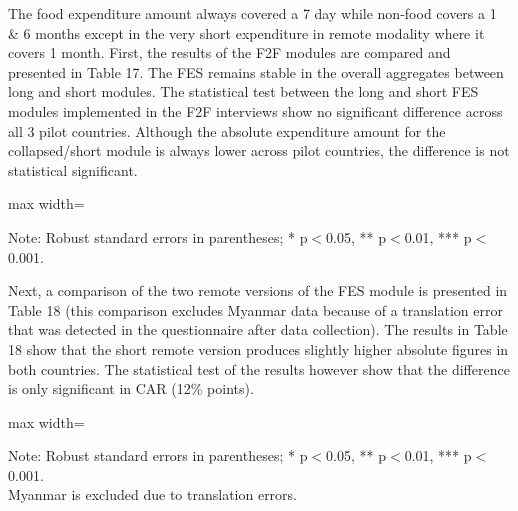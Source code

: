 \documentclass[11pt,harvard]{article}
\begin{document}
The food expenditure amount always covered a 7 day while non-food covers a 1 \& 6 months except in the very short expenditure in remote modality where it covers 1 month. First, the results of the F2F modules are compared and presented in Table 17. The FES remains stable in the overall aggregates between long and short modules. The statistical test between the long and short FES modules implemented in the F2F interviews show no significant difference across all 3 pilot countries. Although the absolute expenditure amount for the collapsed/short module is always lower across pilot countries, the difference is not statistical significant. 

\begin{table}[htbp]
	\centering
	\begin{adjustbox}{max width=\textwidth}
		\begin{threeparttable}
			\caption{Impact of Module Length on Expenditure and FES in F2F Surveys}
			\scriptsize
			 
			\label{tab:FES_F2F_Form_Length_All_Country}
			\begin{tablenotes}
				\item Note: Robust standard errors in parentheses; * p$<$0.05, ** p$<$0.01, *** p$<$0.001. 
			\end{tablenotes}
		\end{threeparttable}
	\end{adjustbox}
\end{table}

Next, a comparison of the two remote versions of the FES module is presented in Table 18 (this comparison excludes Myanmar data because of a translation error that was detected in the questionnaire after data collection). The results in Table 18 show that the short remote version produces slightly higher absolute figures in both countries. The statistical test of the results however show that the difference is only significant in CAR (12\% points). 

\begin{table}[htbp]
	\centering
	\begin{adjustbox}{max width=\textwidth}
		\begin{threeparttable}
			\caption{Impact of Module Length on Expenditure and FES in Remote Surveys}
			\scriptsize
			 
			\label{tab:FES_RM_Form_Length_ECU_CAR}
			\begin{tablenotes}
				\item Note: Robust standard errors in parentheses; * p$<$0.05, ** p$<$0.01, *** p$<$0.001. \\
						 Myanmar is excluded due to translation errors.
			\end{tablenotes}
		\end{threeparttable}
	\end{adjustbox}
\end{table}
\end{document}

